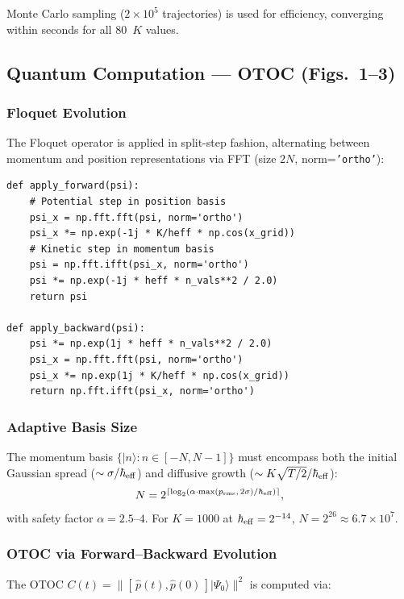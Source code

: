 \documentclass[11pt,a4paper]{article}
\newcommand{\hb}{\hbar_{\rm eff}}
\begin{document}
Monte Carlo sampling ($2\times10^{5}$ trajectories) is used for efficiency, converging within seconds for all 80~$K$ values.

\subsection{Quantum Computation --- OTOC (Figs.~1--3)}

\subsubsection*{Floquet Evolution}

The Floquet operator is applied in split-step fashion, alternating between momentum and position representations via FFT (size $2N$, norm=\texttt{'ortho'}):

\begin{lstlisting}
def apply_forward(psi):
    # Potential step in position basis
    psi_x = np.fft.fft(psi, norm='ortho')
    psi_x *= np.exp(-1j * K/heff * np.cos(x_grid))
    # Kinetic step in momentum basis
    psi = np.fft.ifft(psi_x, norm='ortho')
    psi *= np.exp(-1j * heff * n_vals**2 / 2.0)
    return psi

def apply_backward(psi):
    psi *= np.exp(1j * heff * n_vals**2 / 2.0)
    psi_x = np.fft.fft(psi, norm='ortho')
    psi_x *= np.exp(1j * K/heff * np.cos(x_grid))
    return np.fft.ifft(psi_x, norm='ortho')
\end{lstlisting}

\subsubsection*{Adaptive Basis Size}

The momentum basis $\{|n\rangle: n\in[-N,N-1]\}$ must encompass both the initial Gaussian spread ($\sim\sigma/\hb$) and diffusive growth ($\sim K\sqrt{T/2}/\hb$):
\begin{equation}
N = 2^{\lceil\log_{2}(\alpha\cdot\max(p_{\rm rms},\,2\sigma)/\hb)\rceil},
\end{equation}
with safety factor $\alpha=2.5$--$4$. For $K=1000$ at $\hb=2^{-14}$, $N=2^{26}\approx6.7\times10^{7}$.

\subsubsection*{OTOC via Forward--Backward Evolution}

The OTOC $C(t)=\|[\,\hat{p}(t),\hat{p}(0)\,]|\Psi_{0}\rangle\|^{2}$ is computed via:
\end{document}
